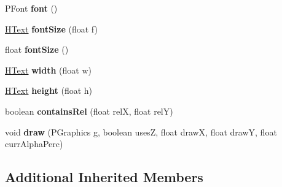 \begin{DoxyCompactItemize}
\item 
\hypertarget{classhype_1_1drawable_1_1_h_text_a273e812e78225a53012e00595543591d}{P\-Font {\bfseries font} ()}\label{classhype_1_1drawable_1_1_h_text_a273e812e78225a53012e00595543591d}

\item 
\hypertarget{classhype_1_1drawable_1_1_h_text_a8972dfdc3677f1477da78d43a65c8bc9}{\hyperlink{classhype_1_1drawable_1_1_h_text}{H\-Text} {\bfseries font\-Size} (float f)}\label{classhype_1_1drawable_1_1_h_text_a8972dfdc3677f1477da78d43a65c8bc9}

\item 
\hypertarget{classhype_1_1drawable_1_1_h_text_aa0c33b11fb4c2adb4ff564fd8647df16}{float {\bfseries font\-Size} ()}\label{classhype_1_1drawable_1_1_h_text_aa0c33b11fb4c2adb4ff564fd8647df16}

\item 
\hypertarget{classhype_1_1drawable_1_1_h_text_a34d2ed02a16e5cfde7a1234c81752405}{\hyperlink{classhype_1_1drawable_1_1_h_text}{H\-Text} {\bfseries width} (float w)}\label{classhype_1_1drawable_1_1_h_text_a34d2ed02a16e5cfde7a1234c81752405}

\item 
\hypertarget{classhype_1_1drawable_1_1_h_text_aa5de72954d2566d756b8f215fec23a1b}{\hyperlink{classhype_1_1drawable_1_1_h_text}{H\-Text} {\bfseries height} (float h)}\label{classhype_1_1drawable_1_1_h_text_aa5de72954d2566d756b8f215fec23a1b}

\item 
\hypertarget{classhype_1_1drawable_1_1_h_text_a0e58a8da08b4b63657be00cbc8a317ec}{boolean {\bfseries contains\-Rel} (float rel\-X, float rel\-Y)}\label{classhype_1_1drawable_1_1_h_text_a0e58a8da08b4b63657be00cbc8a317ec}

\item 
\hypertarget{classhype_1_1drawable_1_1_h_text_a45d252ab33bf417402736b7f3c5476b8}{void {\bfseries draw} (P\-Graphics g, boolean uses\-Z, float draw\-X, float draw\-Y, float curr\-Alpha\-Perc)}\label{classhype_1_1drawable_1_1_h_text_a45d252ab33bf417402736b7f3c5476b8}

\end{DoxyCompactItemize}
\subsection*{Additional Inherited Members}


